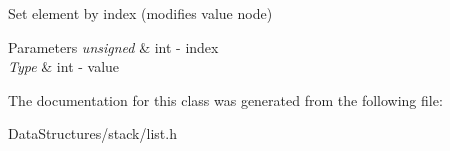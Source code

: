 Set element by index (modifies value node) 


\begin{DoxyParams}{Parameters}
{\em unsigned} & int -\/ index \\
\hline
{\em Type} & int -\/ value \\
\hline
\end{DoxyParams}


The documentation for this class was generated from the following file\+:\begin{DoxyCompactItemize}
\item 
Data\+Structures/stack/list.\+h\end{DoxyCompactItemize}
